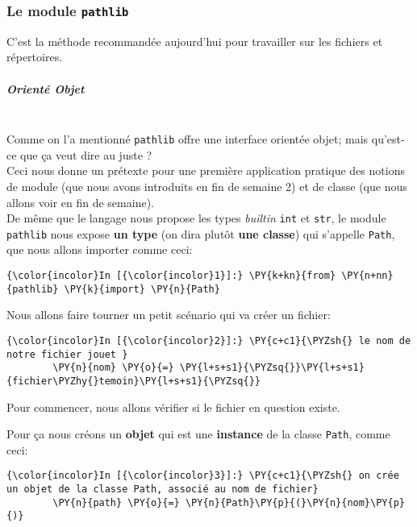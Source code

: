     \hypertarget{le-module-pathlib}{%
\subsubsection{\texorpdfstring{Le module
\texttt{pathlib}}{Le module pathlib}}\label{le-module-pathlib}}

    C'est la méthode recommandée aujourd'hui pour travailler sur les
fichiers et répertoires.

    \hypertarget{orientuxe9-objet}{%
\subparagraph{Orienté Objet\\\\}\label{orientuxe9-objet}}

    Comme on l'a mentionné \texttt{pathlib} offre une interface orientée
objet; mais qu'est-ce que ça veut dire au juste ?\\

Ceci nous donne un prétexte pour une première application pratique des
notions de module (que nous avons introduits en fin de semaine 2) et de
classe (que nous allons voir en fin de semaine).\\

    De même que le langage nous propose les types \emph{builtin}
\texttt{int} et \texttt{str}, le module \texttt{pathlib} nous expose
\textbf{un type} (on dira plutôt \textbf{une classe}) qui s'appelle
\texttt{Path}, que nous allons importer comme ceci:

    \begin{Verbatim}[commandchars=\\\{\}]
{\color{incolor}In [{\color{incolor}1}]:} \PY{k+kn}{from} \PY{n+nn}{pathlib} \PY{k}{import} \PY{n}{Path}
\end{Verbatim}


    Nous allons faire tourner un petit scénario qui va créer un fichier:

    \begin{Verbatim}[commandchars=\\\{\}]
{\color{incolor}In [{\color{incolor}2}]:} \PY{c+c1}{\PYZsh{} le nom de notre fichier jouet }
        \PY{n}{nom} \PY{o}{=} \PY{l+s+s1}{\PYZsq{}}\PY{l+s+s1}{fichier\PYZhy{}temoin}\PY{l+s+s1}{\PYZsq{}}
\end{Verbatim}


    Pour commencer, nous allons vérifier si le fichier en question existe.

Pour ça nous créons un \textbf{objet} qui est une \textbf{instance} de
la classe \texttt{Path}, comme ceci:

    \begin{Verbatim}[commandchars=\\\{\}]
{\color{incolor}In [{\color{incolor}3}]:} \PY{c+c1}{\PYZsh{} on crée un objet de la classe Path, associé au nom de fichier}
        \PY{n}{path} \PY{o}{=} \PY{n}{Path}\PY{p}{(}\PY{n}{nom}\PY{p}{)}
\end{Verbatim}


